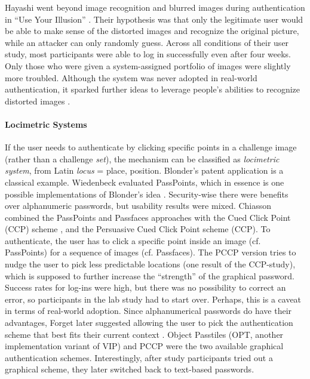	Hayashi \etal went beyond image recognition and blurred images during authentication in ``Use Your Illusion'' \cite{Hayashi2008UseYourIllusion}. Their hypothesis was that only the legitimate user would be able to make sense of the distorted images and recognize the original picture, while an attacker can only randomly guess. Across all conditions of their user study, most participants were able to log in successfully even after four weeks. Only those who were given a system-assigned portfolio of images were slightly more troubled. Although the system was never adopted in real-world authentication, it sparked further ideas to leverage people's abilities to recognize distorted images \cite[http://arima.okoze.net/illusion/]{Castelluccia2017ImplicitVisual}. 
	
	
	\paragraph{Locimetric Systems}
	If the user needs to authenticate by clicking specific points in a challenge image (rather than a challenge \textit{set}), the mechanism can be classified as \textit{locimetric system}, from Latin \textit{locus} = place, position. Blonder's patent application \cite{Blonder1996PatentGraphicalPW} is a classical example. Wiedenbeck \etal evaluated PassPoints, which in essence is one possible implementations of Blonder's idea \cite{Wiedenbeck2005PassPoints}. Security-wise there were benefits over alphanumeric passwords, but usability results were mixed. Chiasson \etal combined the PassPoints and Passfaces approaches with the Cued Click Point (CCP) scheme \cite{Chiasson2007CCP}, and the Persuasive Cued Click Point scheme \cite{Chiasson2008PCCP} (CCP). To authenticate, the user has to click a specific point inside an image (cf. PassPoints) for a sequence of images (cf. Passfaces). The PCCP version tries to nudge the user to pick less predictable locations (one result of the CCP-study), which is supposed to further increase the ``strength'' of the graphical password. Success rates for log-ins were high, but there was no possibility to correct an error, so participants in the lab study had to start over. Perhaps, this is a caveat in terms of real-world adoption. Since alphanumerical passwords do have their advantages, Forget \etal later suggested allowing the user to pick the authentication scheme that best fits their current context \cite{Forget2015CYOA}. Object Passtiles (OPT, another implementation variant of VIP) and PCCP were the two available graphical authentication schemes. Interestingly, after study participants tried out a graphical scheme, they later switched back to text-based passwords. 
	
